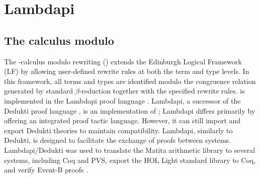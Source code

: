 \chapter{Lambdapi}\label{ch:intro-lambdapi}

\section{The \texorpdfstring{\lp } - calculus modulo}

The \lp-calculus modulo rewriting (\lpm)  extends the Edinburgh Logical Framework (LF) \cite{lf} by allowing user-defined rewrite rules at both the term and type levels.
In this framework, all terms and types are identified modulo the congruence relation generated by standard $\beta$-reduction together with the specified rewrite rules.
{\lpm} is implemented in the Lambdapi proof language \cite{lambdapi}. Lambdapi, a successor of the Dedukti proof language \cite{Dedukti-ref, Dedukti-ref2}, is an implementation of {\lpm}; Lambdapi differs primarily by offering an integrated proof tactic language.
However, it can still import and export Dedukti theories to maintain compatibility. Lambdapi, similarly to Dedukti, is designed to facilitate the exchange of proofs between systems.
Lambdapi/Dedukti was used to translate \cite{thire:tel-03224039} the Matita arithmetic library to several systems, including Coq and PVS, export \cite{blanqui:hal-04613926} the HOL Light standard library to Coq,
and verify Event-B proofs \cite{eventb2lp}.


